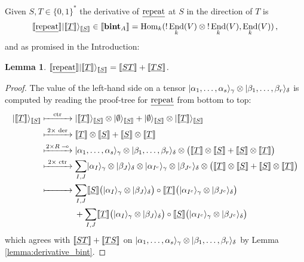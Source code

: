 \documentclass[english,letter paper,12pt,reqno]{article}
\DeclarePairedDelimiter\ket{\lvert}{\rangle}
\newtheorem{lemma}[theorem]{Lemma}
\theoremstyle{example}
\def\Hom{\operatorname{Hom}}
\def\be{\begin{equation}}
\def\ee{\end{equation}}
\DeclareMathOperator{\End}{End}
\begin{document}
Given $S, T \in \{0,1\}^*$ the derivative of $\underline{\textup{repeat}}$ at $S$ in the direction of $T$ is
\be
\den{\repeat}\ket{\den{\underline{T}}}_{\den{\underline{S}}} \in \den{\binta_A} = \Hom_k( {!} \End_k(V) \otimes {!}\End_k(V), \End_k(V))\,,
\ee
and as promised in the Introduction:

\begin{lemma} $\den{\repeat}\ket{\den{\underline{T}}}_{\den{\underline{S}}} = \den{\underline{ST}} + \den{\underline{TS}}$.
\end{lemma}
\begin{proof}
The value of the left-hand side on a tensor $\ket{\alpha_1,\ldots,\alpha_s}_{\gamma} \otimes \ket{\beta_1,\ldots,\beta_r}_{\delta}$ is computed by reading the proof-tree for $\underline{\textup{repeat}}$ from bottom to top:
\begin{align*}
\ket{\den{\underline{T}}}_{\den{\underline{S}}} 
&\xmapsto{\makebox[1cm]{\scriptsize\text{ctr}}} \ket{\den{\underline{T}}}_{\den{\underline{S}}} \otimes \ket{\emptyset}_{\den{\underline{S}}} + \ket{\emptyset}_{\den{\underline{S}}} \otimes \ket{\den{\underline{T}}}_{\den{\underline{S}}}
\\&\xmapsto{\makebox[1cm]{\scriptsize$2\times$ der}} \den{\underline{T}} \otimes \den{\underline{S}} + \den{\underline{S}} \otimes \den{\underline{T}}
\\&\xmapsto{\makebox[1cm]{\scriptsize${2\times} {R \multimap}$}} \ket{\alpha_1,\ldots,\alpha_s}_{\gamma} \otimes \ket{\beta_1,\ldots,\beta_r}_{\delta} \otimes \big(\den{\underline{T}} \otimes \den{\underline{S}} + \den{\underline{S}} \otimes \den{\underline{T}}\big)
\\&\xmapsto{\makebox[1cm]{\scriptsize$2\times$ ctr}} \sum_{I,J} \ket{\alpha_I}_{\gamma} \otimes \ket{\beta_J}_{\delta} \otimes \ket{\alpha_{I^c}}_{\gamma} \otimes \ket{\beta_{J^c}}_{\delta} \otimes \big( \den{\underline{T}} \otimes \den{\underline{S}} + \den{\underline{S}} \otimes \den{\underline{T}} \big)
\\&\xmapsto{\makebox[1cm]{}} \sum_{I,J} \den{\underline{S}}\big( \ket{\alpha_I}_{\gamma} \otimes \ket{\beta_J}_{\delta} \big) \circ \den{\underline{T}}\big( \ket{\alpha_{I^c}}_{\gamma} \otimes \ket{\beta_{J^c}}_{\delta} \big)
\\& \qquad\qquad + \sum_{I,J} \den{\underline{T}}\big( \ket{\alpha_I}_{\gamma} \otimes \ket{\beta_J}_{\delta} \big) \circ \den{\underline{S}}\big( \ket{\alpha_{I^c}}_{\gamma} \otimes \ket{\beta_{J^c}}_{\delta} \big)
\end{align*}
which agrees with $\llbracket \underline{ST} \rrbracket + \llbracket \underline{TS} \rrbracket$ on $\ket{\alpha_1,\ldots,\alpha_s}_{\gamma} \otimes \ket{\beta_1,\ldots,\beta_r}_{\delta}$ by Lemma \ref{lemma:derivative_bint}.
\end{proof}
\end{document}
